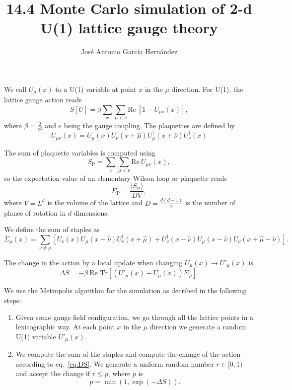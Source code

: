 \documentclass[12pt,a4paper]{article}
\author{José Antonio García Hernández}
\title{14.4 Monte Carlo simulation of 2-d U(1) lattice gauge theory}
\begin{document}
\maketitle

We call $U_{\mu}(x)$ to a U(1) variable at point $x$ in the $\mu$ direction. For U(1), the lattice gauge action reads
\begin{equation}
	\label{eq:wilson_action}
	S[U] = \beta\sum_x \sum_{\mu < \nu} \text{Re}\  \left[1 - U_{\mu\nu}(x) \right],
\end{equation}
where $\beta = \frac{2}{e^2}$ and $e$ being the gauge coupling. The plaquettes are defined by
\begin{equation}
	\label{eq:plaquette}
	U_{\mu\nu}(x) = U_{\mu}(x)U_{\nu}(x+\hat{\mu})U_{\mu}^{\dagger}(x+\hat{\nu})U_{\nu}^{\dagger}(x) 
\end{equation}

The sum of plaquette variables is computed using 
\begin{equation}
	\label{eq:Sp}
	S_{\text{P}} =  \sum_x\sum_{\mu < \nu} \text{Re}\ U_{\mu\nu}(x),
\end{equation}
so the expectation value of an elementary Wilson loop or plaquette reads
\begin{equation}
	\label{eq:Ep}
	E_{\text{P}} =\frac{ \langle S_{\text{P}} \rangle}{D V},
\end{equation}
where $V=L^d$ is the volume of the lattice and $D = \frac{d(d-1)}{2}$ is the number of planes of rotation in $d$ dimensions.

We define the sum of staples as
\begin{equation}
	\label{eq:staples}
	\Sigma_{\mu}(x) = \sum_{\nu \neq \mu} \left[ U_{\nu}(x)U_{\mu}(x+\hat{\nu})U_{\nu}^{\dagger}(x+\hat{\mu}) + U_{\nu}^{\dagger}(x-\hat{\nu})U_{\mu}(x-\hat{\nu})U_{\nu}(x+\hat{\mu}-\hat{\nu})\right] .
\end{equation}


The change in the action  by a local update when changing $U_{\mu}(x) \to U'_{\mu}(x)$ is
\begin{equation}
	\label{eq:DS}
	\Delta S = -\beta \ \text{Re } \text{Tr} \left[ \left( U'_{\mu}(x) - U_{\mu}(x) \right)\Sigma_{\mu}^{\dagger}\right].
\end{equation}

We use the Metropolis algorithm for the simulation as decribed in the following steps:
\begin{enumerate}
	\item Given some gauge field configuration, we go through all the lattice points in a lexicographic way. At each point $x$ in the $\mu$ direction we generate a random U(1) variable $U'_{\mu}(x)$.
	
	\item We compute the sum of the staples and compute the change of the action according to eq.\ \eqref{eq:DS}. We generate a uniform random number $r\in [0,1)$ and accept the change if $r \leq p$, where $p$ is
	\begin{equation}
		p = \min (1, \exp(-\Delta S)).
\end{equation}	 
\end{enumerate}
\end{document}
